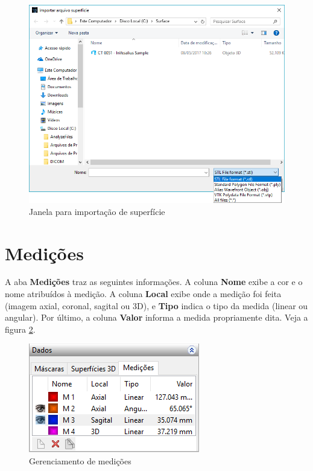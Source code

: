 \begin{figure}[!htb]
\centering
\includegraphics[scale=0.4]{../user_guide_figures/invesalius_screen/import_surface_pt.png}
\caption{Janela para importação de superfície}
\label{fig:import_surface}
\end{figure}

\newpage


\section{Medições}

A aba \textbf{Medições} traz as seguintes informações. A coluna \textbf{Nome} exibe a cor e o
nome atribuídos à medição. A coluna \textbf{Local} exibe onde a medição foi feita (imagem axial,
coronal, sagital ou 3D), e \textbf{Tipo} indica o tipo da medida (linear ou angular). Por último,
a coluna \textbf{Valor} informa a medida propriamente dita. Veja a figura \ref{fig:manager_mensuares}.

\begin{figure}[!htb]
\centering
\includegraphics[scale=0.7]{../user_guide_figures/invesalius_screen/painel_measures_manager_pt.png}
\caption{Gerenciamento de medições}
\label{fig:manager_mensuares}
\end{figure}


